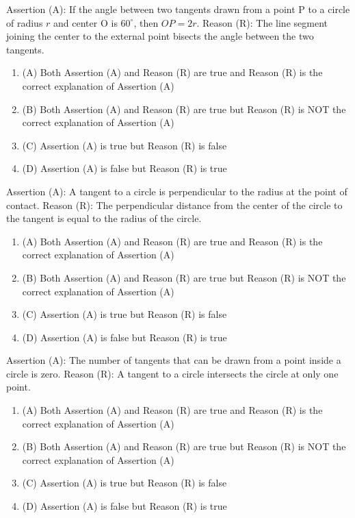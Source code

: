 \documentclass[12pt,a4paper]{exam}
\begin{document}
\begin{questions}
\question[1] Assertion (A): If the angle between two tangents drawn from a point P to a circle of radius $r$ and center O is $60^\circ$, then $OP = 2r$. Reason (R): The line segment joining the center to the external point bisects the angle between the two tangents.
\begin{enumerate}[label=(\Alph*)]
  \item (A) Both Assertion (A) and Reason (R) are true and Reason (R) is the correct explanation of Assertion (A)
  \item (B) Both Assertion (A) and Reason (R) are true but Reason (R) is NOT the correct explanation of Assertion (A)
  \item (C) Assertion (A) is true but Reason (R) is false
  \item (D) Assertion (A) is false but Reason (R) is true
\end{enumerate}
\vspace{0.15cm}

\question[1] Assertion (A): A tangent to a circle is perpendicular to the radius at the point of contact. Reason (R): The perpendicular distance from the center of the circle to the tangent is equal to the radius of the circle.
\begin{enumerate}[label=(\Alph*)]
  \item (A) Both Assertion (A) and Reason (R) are true and Reason (R) is the correct explanation of Assertion (A)
  \item (B) Both Assertion (A) and Reason (R) are true but Reason (R) is NOT the correct explanation of Assertion (A)
  \item (C) Assertion (A) is true but Reason (R) is false
  \item (D) Assertion (A) is false but Reason (R) is true
\end{enumerate}
\vspace{0.15cm}

\question[1] Assertion (A): The number of tangents that can be drawn from a point inside a circle is zero. Reason (R): A tangent to a circle intersects the circle at only one point.
\begin{enumerate}[label=(\Alph*)]
  \item (A) Both Assertion (A) and Reason (R) are true and Reason (R) is the correct explanation of Assertion (A)
  \item (B) Both Assertion (A) and Reason (R) are true but Reason (R) is NOT the correct explanation of Assertion (A)
  \item (C) Assertion (A) is true but Reason (R) is false
  \item (D) Assertion (A) is false but Reason (R) is true
\end{enumerate}
\vspace{0.15cm}


\end{questions}
\end{document}
